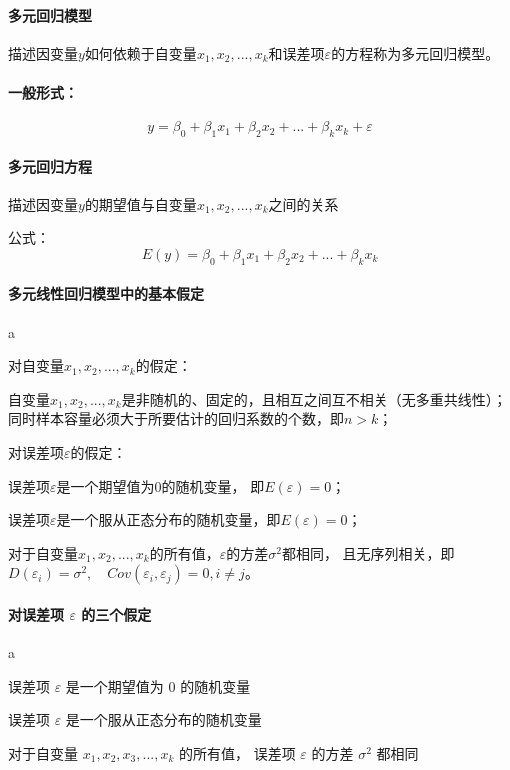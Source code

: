 \documentclass[UTF8,10pt]{book}
\begin{document}
\paragraph{多元回归模型}	描述因变量$y$如何依赖于自变量$x_1,x_2,...,x_k$和误差项$\varepsilon$的方程称为多元回归模型。 

\paragraph{一般形式：}$$y = \beta_0 + \beta_1 x_1 + \beta_2 x_2 + ... + \beta_k x_k + \varepsilon $$

\paragraph{多元回归方程}	描述因变量$y$的期望值与自变量$x_1,x_2,...,x_k$之间的关系 

公式：$$E(y) = \beta_0 + \beta_1 x_1 + \beta_2 x_2 + ... + \beta_k x_k$$

\paragraph{多元线性回归模型中的基本假定}	a

对自变量$x_1,x_2,...,x_k$的假定：

自变量$x_1,x_2,...,x_k$是非随机的、固定的，且相互之间互不相关（无多重共线性）；
同时样本容量必须大于所要估计的回归系数的个数，即$n>k$； 

对误差项$\varepsilon$的假定：

误差项$\varepsilon$是一个期望值为$0$的随机变量，
即$E(\varepsilon)=0$；

误差项$\varepsilon$是一个服从正态分布的随机变量，即$E(\varepsilon)=0$； 

对于自变量$x_1,x_2,...,x_k$的所有值，$\varepsilon$的方差$\sigma^2$都相同，
且无序列相关，即
$D(\varepsilon_i) = \sigma^2 , \quad Cov(\varepsilon_i,\varepsilon_j)=0,i \neq j$。

\paragraph{对误差项 $\varepsilon$ 的三个假定}	a

误差项 $\varepsilon$ 是一个期望值为 $0$ 的随机变量

误差项 $\varepsilon$ 是一个服从正态分布的随机变量 

对于自变量 $ x_1, x_2 , x_3 , ... ,x_k$ 的所有值，
误差项 $\varepsilon$ 的方差 $ \sigma^2 $ 都相同
\end{document}
